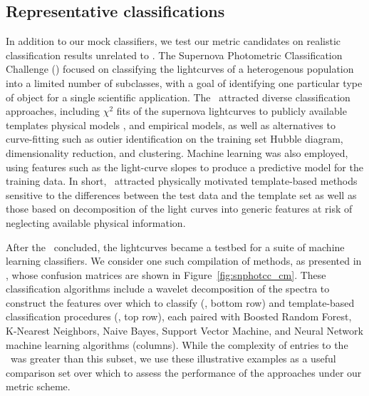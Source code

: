 \subsection{Representative classifications}
\label{sec:realdata}

In addition to our mock classifiers, we test our metric candidates on realistic classification results unrelated to \plasticc.
The Supernova Photometric Classification Challenge (\snphotcc) \citep{kessler_supernova_2010} focused on classifying the lightcurves of a heterogenous population into a limited number of subclasses, with a goal of identifying one particular type of object for a single scientific application.
The \snphotcc\ attracted diverse classification approaches, including $\chi^{2}$ fits of the supernova lightcurves to publicly available templates \citep{2002PASP..114..803N} physical models \citep{2008ApJ...681..482C}, and empirical models, as well as alternatives to curve-fitting such as
outier identification on the training set Hubble diagram, dimensionality reduction,
and clustering.
Machine learning was also employed, using features such as the light-curve slopes to produce a predictive model for the training data.
In short, \snphotcc\ attracted physically motivated template-based methods sensitive to the differences between the test data and the template set
as well as those based on decomposition of the light curves into generic features at risk of neglecting available physical information.

After the \snphotcc\ concluded, the lightcurves became a testbed for a suite of machine learning classifiers.
We consider one such compilation of methods, as presented in \citet{lochner_photometric_2016}, whose confusion matrices are shown in Figure~\ref{fig:snphotcc_cm}.
These classification algorithms include a wavelet decomposition of the spectra to construct the features over which to classify (\citet{2011MNRAS.414.1987N}, bottom row) and template-based classification procedures (\citet{2011ApJ...738..162S}, top row), each paired with Boosted Random Forest, K-Nearest Neighbors, Naive Bayes, Support Vector Machine, and Neural Network machine learning algorithms (columns).
While the complexity of entries to the \snphotcc\ was greater than this subset, we use these illustrative examples as a useful comparison set over which to assess the performance of the approaches under our metric scheme.

